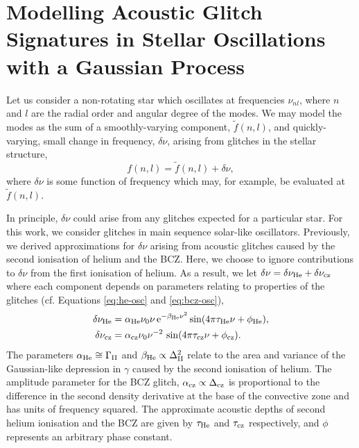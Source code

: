 %
%
%
%
%
\chapter[Modelling Acoustic Glitches with a Gaussian Process]{Modelling Acoustic Glitch Signatures in Stellar Oscillations with a Gaussian Process}\label{chap:glitch-gp}

Let us consider a non-rotating star which oscillates at frequencies \(\nu_{nl}\), where \(n\) and \(l\) are the radial order and angular degree of the modes. We may model the modes as the sum of a smoothly-varying component, \(\tilde{f}(n, l)\), and quickly-varying, small change in frequency, \(\delta\nu\), arising from glitches in the stellar structure,
%
\begin{equation}
    f(n, l) = \tilde{f}(n, l) + \delta\nu,\label{eq:general-glitch}
\end{equation}
%
where \(\delta\nu\) is some function of frequency which may, for example, be evaluated at \(\tilde{f}(n, l)\).

In principle, \(\delta\nu\) could arise from any glitches expected for a particular star. For this work, we consider glitches in main sequence solar-like oscillators. Previously, we derived approximations for \(\delta\nu\) arising from acoustic glitches caused by the second ionisation of helium and the BCZ. Here, we choose to ignore contributions to \(\delta\nu\) from the first ionisation of helium. As a result, we let \(\delta\nu = \delta\nu_{{\mathrm{He}}} + \delta\nu_{{\mathrm{cz}}}\) where each component depends on parameters relating to properties of the glitches (cf. Equations \ref{eq:he-osc} and \ref{eq:bcz-osc}),
%
\begin{align}
    \delta\nu_{{\mathrm{He}}} &= \alpha_{{\mathrm{He}}} \nu_0 \nu \, \mathrm{e}^{-\beta_{{\mathrm{He}}} \nu^2} \sin(4\pi\tau_{{\mathrm{He}}}\nu + \phi_{{\mathrm{He}}}), \label{eq:he-glitch}\\
    \delta\nu_{{\mathrm{cz}}} &= \alpha_{{\mathrm{cz}}} \nu_0 \nu^{-2} \, \sin(4\pi\tau_{{\mathrm{cz}}}\nu + \phi_{{\mathrm{cz}}}). \label{eq:bcz-glitch}
\end{align}
%
The parameters \(\alpha_{{\mathrm{He}}} \cong \Gamma_{{\mathrm{II}}}\) and \(\beta_{{\mathrm{He}}} \propto \Delta_{{\mathrm{II}}}^2\) relate to the area and variance of the Gaussian-like depression in \(\gamma\) caused by the second ionisation of helium. The amplitude parameter for the BCZ glitch, \(\alpha_{{\mathrm{cz}}} \propto \Delta_{{\mathrm{cz}}}\) is proportional to the difference in the second density derivative at the base of the convective zone and has units of frequency squared. The approximate acoustic depths of second helium ionisation and the BCZ are given by \(\tau_{{\mathrm{He}}}\) and \(\tau_{{\mathrm{cz}}}\) respectively, and \(\phi\) represents an arbitrary phase constant.

